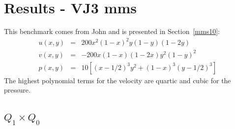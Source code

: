 \newpage
\section*{Results - VJ3 mms}

This benchmark comes from John \etal \cite{jolm17} and is presented in Section~\ref{mms10}:
\begin{eqnarray}
u(x,y) &=& 200x^2(1-x)^2y(1-y)(1-2y) \\
v(x,y) &=& -200x(1-x)(1-2x)y^2(1-y)^2 \\
p(x,y) &=& 10\left[(x-1/2)^3y^2+(1-x)^3(y-1/2)^3 \right]
\end{eqnarray}
The highest polynomial terms for the velocity are quartic and cubic for the pressure.

\subsection*{$Q_1\times Q_0$}

